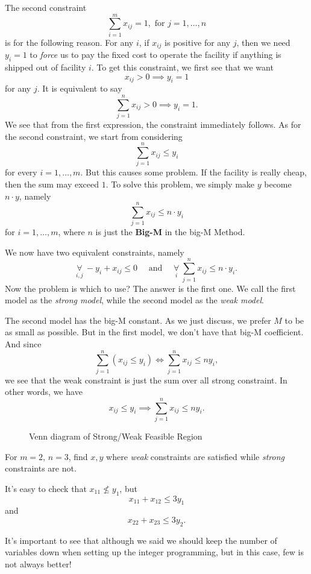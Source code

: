 \begin{note}
	The second constraint
	\[
		\sum\limits_{i=1}^{m} x_{ij} = 1,\text{ for }j = 1, \ldots , n
	\]
	is for the following reason. For any \(i\), if \(x_{ij}\) is positive for any \(j\), then we need \(y_{i} = 1\) to \emph{force} us to pay the fixed cost
	to operate the facility if anything is shipped out of facility \(i\). To get this constraint, we first see that we want
	\[
		x_{ij}>0 \implies y_{i} = 1
	\]
	for any \(j\). It is equivalent to say
	\[
		\sum\limits_{j=1}^{n} x_{ij}>0 \implies y_{i} = 1.
	\]
	We see that from the first expression, the constraint immediately follows. As for the second constraint, we start from considering
	\[
		\sum\limits_{j=1}^{n} x_{ij}\leq y_{i}
	\]
	for every \(i = 1, \ldots , m\). But this causes some problem. If the facility is really cheap, then the sum may exceed \(1\).
	To solve this problem, we simply make \(y\) become \(n\cdot y\), namely
	\[
		\sum\limits_{j=1}^{n} x_{ij}\leq n\cdot y_{i}
	\]
	for \(i = 1, \ldots, m\), where \(n\) is just the \textbf{Big-M} in the big-M Method.
\end{note}

We now have two equivalent constraints, namely
\[
	\underset{i, j}{\forall }\ -y_{i} + x_{ij}\leq 0\quad  \text{ and }\quad \underset{i}{\forall }\ \sum\limits_{j=1}^{n} x_{ij}\leq n\cdot y_{i}.
\]
Now the problem is which to use? The answer is the first one. We call the first model as the \emph{strong model}, while the second model as
the \emph{weak model}.

\begin{intuition}
	The second model has the big-M constant. As we just discuss, we prefer \(M\) to be as small as possible. But in the first model, we don't have that
	big-M coefficient. And since
	\[
		\sum\limits_{j=1}^{n} \left(x_{ij}\leq y_i\right) \iff \sum\limits_{j=1}^{n} x_{ij}\leq n y_{i},
	\]
	we see that the weak constraint is just the sum over all strong constraint. In other words, we have
	\[
		x_{ij}\leq y_i \implies \sum\limits_{j=1}^{n} x_{ij}\leq n y_{i}.
	\]
	\begin{figure}[H]
		\centering
		\caption{Venn diagram of Strong/Weak Feasible Region}
		\label{fig:strong-weak-constraint}
	\end{figure}

	\begin{eg}
		For \(m = 2\), \(n = 3\), find \(x, y\) where \emph{weak} constraints are satisfied while \emph{strong} constraints are not.
		\begin{figure}[H]
			\centering
			\label{fig:integer-programming-eg2}
		\end{figure}
		It's easy to check that \(x_{11}\nleq y_1\), but
		\[
			x_{11}+x_{12} \leq 3y_1
		\]
		and
		\[
			x_{22}+x_{23}\leq 3y_2.
		\]
	\end{eg}
\end{intuition}
\begin{remark}
	It's important to see that although we said we should keep the number of variables down when setting up the integer programming, but in this case,
	few is not always better!
\end{remark}

